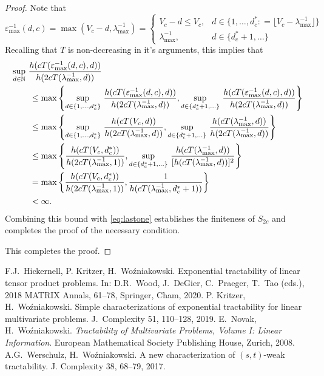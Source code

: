 \documentclass[11pt,a4paper]{article}
\begin{document}
\begin{proof}
Note that 
\[
\varepsilon^{-1}_{\max}(d,c) = \max(V_c - d,\lambda_{\max}^{-1}) 
= \begin{cases} V_c - d \le V_c, & d \in \{1, \ldots, d^*_c : = \lfloor V_c - \lambda_{\max}^{-1} \rfloor\} \\
\lambda_{\max}^{-1}, & d \in \{d^*_c+1, \ldots\}
\end{cases}
\]
Recalling that $T$ is non-decreasing in it's arguments, this implies that 
\begin{align*}
    \MoveEqLeft{\sup_{d\in\naturals} \,
		 \frac{ h(cT(\varepsilon^{-1}_{\max}(d,c),d))}{h(2cT(\lambda_{\max}^{-1},d))}}\\
  &\le \max \left \{  
  \sup_{d \in \{1, \ldots, d^*_c\}} \,
		 \frac{ h(cT(\varepsilon^{-1}_{\max}(d,c),d))}{h(2cT(\lambda_{\max}^{-1},d))}, 
  \sup_{d\in \{d^*_c+1, \ldots \}} \,
		 \frac{ h(cT(\varepsilon^{-1}_{\max}(d,c),d))}{h(2cT(\lambda_{\max}^{-1},d))}
  \right \} \\
  & \le \max \left \{  
  \sup_{d \in \{1, \ldots, d^*_c\}}  \,
		 \frac{ h(cT(V_c,d))}{h(2cT(\lambda_{\max}^{-1},d))}
  , 
  \sup_{d\in \{d^*_c+1, \ldots \}}  \,
		 \frac{ h(cT(\lambda_{\max}^{-1},d))}{h(2cT(\lambda_{\max}^{-1},d))}
  \right \}
  \\
  & \le \max \left \{  
		 \frac{ h(cT(V_c,d^*_c))}{h(2cT(\lambda_{\max}^{-1},1))}, 
  \sup_{d\in \{d^*_c+1, \ldots \}}  \,
		 \frac{ h(cT(\lambda_{\max}^{-1},d))}{[h(cT(\lambda_{\max}^{-1},d))]^2}
  \right \} \\
  & = \max \left \{  
		 \frac{ h(cT(V_c,d^*_c))}{h(2cT(\lambda_{\max}^{-1},1))}, 
		 \frac{1}{h(cT(\lambda_{\max}^{-1},d^*_c+1))}
  \right \} \\
  & < \infty.
\end{align*}
Combining this bound with \eqref{eq:lastone} establishes the finiteness of $S_{2c}$ and completes the proof of the necessary condition.

	\bigskip

This completes the proof.
\end{proof}

\begin{thebibliography}{99}

 F.J.~Hickernell, P. Kritzer, H.~Wo\'zniakowski.  Exponential tractability of linear tensor product problems. In: 
D.R.~Wood, J.~DeGier, C.~Praeger, T.~Tao (eds.), 2018 MATRIX Annals, 61--78, Springer, Cham, 2020. 
 P. Kritzer, H.~Wo\'zniakowski.
Simple characterizations of exponential tractability for linear
multivariate problems. J.~Complexity 51, 110--128, 2019.
 E.~Novak, H.~Wo\'zniakowski. \textit{Tractability of Multivariate Problems, Volume I: Linear Information}.
European Mathematical Society Publishing House, Zurich, 2008.
  A.G.~Werschulz, H.~Wo\'zniakowski. A new characterization of $(s,t)$-weak tractability. J. Complexity 38, 68--79, 2017. 
\end{thebibliography}
\end{document}

